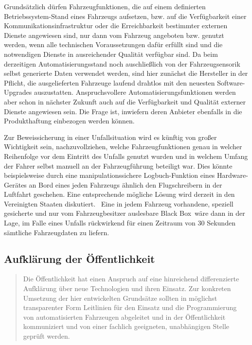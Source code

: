 \documentclass[twoside,a4paper,12pt]{article}
\begin{document}
Grundsätzlich dürfen Fahrzeugfunktionen, die auf einem definierten \glqq Betriebssys\-tem\grqq-Stand eines Fahrzeugs aufsetzen, bzw. auf die 
Verfügbarkeit einer Kommunikationsinfrastruktur oder die Erreichbarkeit bestimmter externen Dienste angewiesen sind, nur dann vom Fahrzeug 
angeboten bzw. genutzt werden, wenn alle technischen Voraussetzungen dafür erfüllt sind und die notwendigen Dienste in ausreichender 
Qualität verfügbar sind. Da beim derzeitigen Automatisierungsstand noch auschließlich von der Fahrzeugsensorik selbst generierte Daten verwendet werden, 
sind hier zunächst die Hersteller in der Pflicht, die ausgelieferten Fahrzeuge laufend drahtlos mit den neuesten Software-Upgrades auszustatten.
Anspruchsvollere Automatisierungsfunktionen werden aber schon in nächster Zukunft auch auf die Verfügbarkeit und Qualität externer Dienste 
angewiesen sein. Die Frage ist, inwiefern deren Anbieter ebenfalls in die Produkthaftung einbezogen werden können.

Zur Beweissicherung in einer Unfallsituation wird es künftig von großer Wichtigkeit sein, nachzuvollziehen, welche Fahrzeugfunktionen genau in welcher 
Reihenfolge vor dem Eintritt des Unfalls genutzt wurden und in welchem Umfang der Fahrer selbst manuell an der Fahrzeugführung beteiligt war. Dies 
könnte beispielsweise durch eine manipulationssichere Logbuch-Funktion eines Hardware-Gerätes an Bord eines jeden Fahrzeugs ähnlich den Flugschreibern 
in der Luftfahrt geschehen. Eine entsprechende mögliche Lösung wird derzeit in den Vereinigten Staaten diskutiert.~\cite{epic} Eine in jedem Fahrzeug
vorhandene, speziell gesicherte und nur vom Fahrzeugbesitzer auslesbare \glqq Black Box\grqq\ wäre dann in der Lage, im Falle eines Unfalls rückwirkend 
für einen Zeitraum von 30 Sekunden sämtliche Fahrzeugdaten zu liefern.

\subsection{Aufklärung der Öffentlichkeit} \label{AufklaerungDerOeffentlichkeit}

\begin{quote}
\glqq
Die Öffentlichkeit hat einen Anspruch auf eine hinreichend differenzierte Aufklärung
über neue Technologien und ihren Einsatz. Zur konkreten Umsetzung der hier entwickelten Grundsätze sollten in möglichst 
transparenter Form Leitlinien für den Einsatz und die
Programmierung von automatisierten Fahrzeugen abgeleitet und in der Öffentlichkeit
kommuniziert und von einer fachlich geeigneten, unabhängigen Stelle geprüft werden.\grqq\mbox{~\cite[S. 12]{ek}}
\end{quote}
\end{document}
